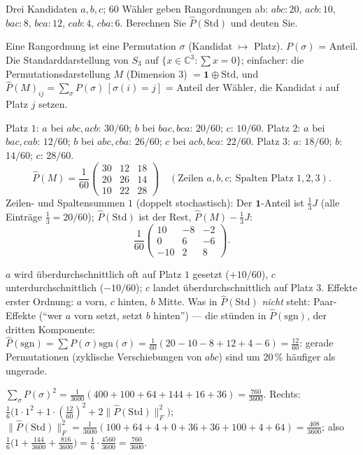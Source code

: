 \begin{aufgabe}
Drei Kandidaten $a, b, c$; $60$ Wähler geben Rangordnungen ab: $abc\colon20$, $acb\colon10$, $bac\colon8$, $bca\colon12$, $cab\colon4$, $cba\colon6$. Berechnen Sie $\hat P(\mathrm{Std})$ und deuten Sie.

\loesung
{}
Eine Rangordnung ist eine Permutation $\sigma$ (Kandidat $\mapsto$ Platz). $P(\sigma)$ = Anteil. Die Standarddarstellung von $S_3$ auf $\{x\in\mathbb C^{3}\colon\sum x = 0\}$; einfacher: die Permutationsdarstellung $M$ (Dimension $3$) $= \mathbf 1\oplus\mathrm{Std}$, und $\hat P(M)_{ij} = \sum_\sigma P(\sigma)\,[\sigma(i) = j]$ = Anteil der Wähler, die Kandidat $i$ auf Platz $j$ setzen.

Platz $1$: $a$ bei $abc, acb$: $30/60$; $b$ bei $bac, bca$: $20/60$; $c$: $10/60$. Platz $2$: $a$ bei $bac, cab$: $12/60$; $b$ bei $abc, cba$: $26/60$; $c$ bei $acb, bca$: $22/60$. Platz $3$: $a$: $18/60$; $b$: $14/60$; $c$: $28/60$.
\[ \hat P(M) = \frac1{60}\begin{pmatrix}30 & 12 & 18\\ 20 & 26 & 14\\ 10 & 22 & 28\end{pmatrix}\quad(\text{Zeilen } a, b, c;\ \text{Spalten Platz } 1, 2, 3). \]
Zeilen- und Spaltensummen $1$ (doppelt stochastisch): Der $\mathbf 1$-Anteil ist $\frac13J$ (alle Einträge $\frac13 = 20/60$); $\hat P(\mathrm{Std})$ ist der Rest, $\hat P(M) - \frac13J$:
\[ \frac1{60}\begin{pmatrix}10 & -8 & -2\\ 0 & 6 & -6\\ -10 & 2 & 8\end{pmatrix}. \]

$a$ wird überdurchschnittlich oft auf Platz $1$ gesetzt ($+10/60$), $c$ unterdurchschnittlich ($-10/60$); $c$ landet überdurchschnittlich auf Platz $3$. Effekte erster Ordnung: $a$ vorn, $c$ hinten, $b$ Mitte. Was in $\hat P(\mathrm{Std})$ \emph{nicht} steht: Paar-Effekte (\enquote{wer $a$ vorn setzt, setzt $b$ hinten}) --- die stünden in $\hat P(\mathrm{sgn})$, der dritten Komponente: $\hat P(\mathrm{sgn}) = \sum P(\sigma)\mathrm{sgn}(\sigma) = \frac1{60}(20 - 10 - 8 + 12 + 4 - 6) = \frac{12}{60}$: gerade Permutationen (zyklische Verschiebungen von $abc$) sind um $20\,\%$ häufiger als ungerade.

$\sum_\sigma P(\sigma)^{2} = \frac1{3600}(400 + 100 + 64 + 144 + 16 + 36) = \frac{760}{3600}$. Rechts: $\frac16\bigl(1\cdot1^{2} + 1\cdot(\frac{12}{60})^{2} + 2\|\hat P(\mathrm{Std})\|_F^{2}\bigr)$; $\|\hat P(\mathrm{Std})\|_F^{2} = \frac1{3600}(100 + 64 + 4 + 0 + 36 + 36 + 100 + 4 + 64) = \frac{408}{3600}$; also $\frac16\bigl(1 + \frac{144}{3600} + \frac{816}{3600}\bigr) = \frac16\cdot\frac{4560}{3600} = \frac{760}{3600}$. \checkmark


\end{aufgabe}
